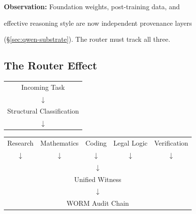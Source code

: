 \medskip


\noindent\textbf{Observation:} Foundation weights, post-training data, and


effective reasoning style are now independent provenance layers


(\S\ref{sec:qwen-substrate}). The router must track all three.





\subsection{The Router Effect}





\begin{center}


\begin{tabular}{c}


Incoming Task \\


$\downarrow$ \\


Structural Classification \\


$\downarrow$ \\


\end{tabular}





\medskip


\begin{tabular}{ccccc}


Research & Mathematics & Coding & Legal Logic & Verification \\


$\downarrow$ & $\downarrow$ & $\downarrow$ & $\downarrow$ & $\downarrow$ \\


\multicolumn{5}{c}{$\downarrow$} \\


\multicolumn{5}{c}{Unified Witness} \\


\multicolumn{5}{c}{$\downarrow$} \\


\multicolumn{5}{c}{WORM Audit Chain} \\


\end{tabular}


\end{center}





